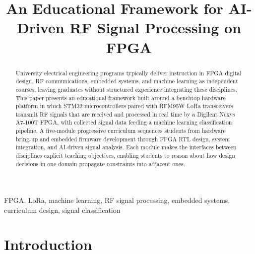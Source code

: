 \documentclass[conference]{IEEEtran}
\begin{document}
\title{An Educational Framework for AI-Driven RF Signal Processing on FPGA}

\author{
\and
{}
}

\maketitle

\begin{abstract}
University electrical engineering programs typically deliver instruction in FPGA digital design, RF communications, embedded systems, and machine learning as independent courses, leaving graduates without structured experience integrating these disciplines. This paper presents an educational framework built around a benchtop hardware platform in which STM32 microcontrollers paired with RFM95W LoRa transceivers transmit RF signals that are received and processed in real time by a Digilent Nexys A7-100T FPGA, with collected signal data feeding a machine learning classification pipeline. A five-module progressive curriculum sequences students from hardware bring-up and embedded firmware development through FPGA RTL design, system integration, and AI-driven signal analysis. Each module makes the interfaces between disciplines explicit teaching objectives, enabling students to reason about how design decisions in one domain propagate constraints into adjacent ones. %
\end{abstract}

\begin{IEEEkeywords}
FPGA, LoRa, machine learning, RF signal processing, embedded systems, curriculum design, signal classification
\end{IEEEkeywords}

\section{Introduction}
\end{document}
